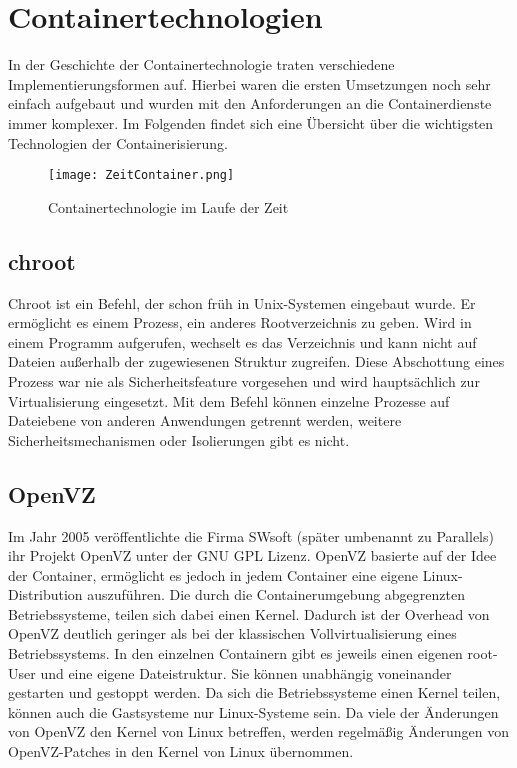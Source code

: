 \section{Containertechnologien} 
\label{sec:Containertechnologien}

In der Geschichte der Containertechnologie traten verschiedene Implementierungsformen auf.
Hierbei waren die ersten Umsetzungen noch sehr einfach aufgebaut und wurden mit den Anforderungen an die Containerdienste immer komplexer.
Im Folgenden findet sich eine Übersicht über die wichtigsten Technologien der Containerisierung.

\begin{figure}[H]
	\begin{center}
		\texttt{[image: ZeitContainer.png]}
	\end{center}
	\caption[Containertechnologie im Laufe der Zeit]{Containertechnologie im Laufe der Zeit}
	\label{fig:CTZeit}
\end{figure}


\subsection{chroot}
\label{sec:chroot}

Chroot ist ein Befehl, der schon früh in Unix-Systemen eingebaut wurde.
Er ermöglicht es einem Prozess, ein anderes Rootverzeichnis zu geben.
Wird in einem Programm  aufgerufen, wechselt es das Verzeichnis und kann nicht auf Dateien außerhalb der zugewiesenen Struktur zugreifen.
Diese Abschottung eines Prozess war nie als Sicherheitsfeature vorgesehen und wird hauptsächlich zur Virtualisierung eingesetzt.
Mit dem Befehl können einzelne Prozesse auf Dateiebene von anderen Anwendungen getrennt werden, weitere Sicherheitsmechanismen oder Isolierungen gibt es nicht.\cite{IEEE7830207,569694, MANPAGE01}

\subsection{OpenVZ}
\label{sec:OpenVZ}

Im Jahr 2005 veröffentlichte die Firma SWsoft (später umbenannt zu Parallels) ihr Projekt OpenVZ unter der GNU GPL Lizenz. OpenVZ basierte auf der Idee der Container, ermöglicht es jedoch in jedem Container eine eigene Linux-Distribution auszuführen.
Die durch die Containerumgebung abgegrenzten Betriebssysteme, teilen sich dabei einen Kernel. Dadurch ist der Overhead von OpenVZ deutlich geringer als bei der klassischen Vollvirtualisierung eines Betriebssystems.
In den einzelnen Containern gibt es jeweils einen eigenen root-User und eine eigene Dateistruktur.
Sie können unabhängig voneinander gestarten und gestoppt werden.
Da sich die Betriebssysteme einen Kernel teilen, können auch die Gastsysteme nur Linux-Systeme sein.
Da viele der Änderungen von OpenVZ den Kernel von Linux betreffen, werden regelmäßig Änderungen von OpenVZ-Patches in den Kernel von Linux übernommen.\cite{OpenVzNews, IEEE4803091,OpenVzHist}


